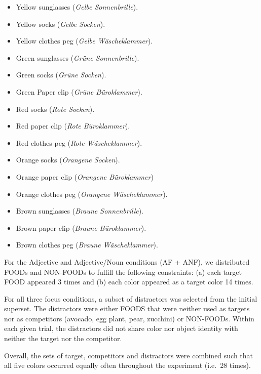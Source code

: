 \documentclass[
]{article}
\providecommand{\tightlist}{%
  \setlength{\itemsep}{0pt}\setlength{\parskip}{0pt}}
\begin{document}
\begin{itemize}
\tightlist
\item
  Yellow sunglasses (\emph{Gelbe Sonnenbrille}).
\item
  Yellow socks (\emph{Gelbe Socken}).
\item
  Yellow clothes peg (\emph{Gelbe Wäscheklammer}).
\item
  Green sunglasses (\emph{Grüne Sonnenbrille}).
\item
  Green socks (\emph{Grüne Socken}).
\item
  Green Paper clip (\emph{Grüne Büroklammer}).
\item
  Red socks (\emph{Rote Socken}).
\item
  Red paper clip (\emph{Rote Büroklammer}).
\item
  Red clothes peg (\emph{Rote Wäscheklammer}).
\item
  Orange socks (\emph{Orangene Socken}).
\item
  Orange paper clip (\emph{Orangene Büroklammer})
\item
  Orange clothes peg (\emph{Orangene Wäscheklammer}).
\item
  Brown sunglasses (\emph{Braune Sonnenbrille}).
\item
  Brown paper clip (\emph{Braune Büroklammer}).
\item
  Brown clothes peg (\emph{Braune Wäscheklammer}).
\end{itemize}

For the Adjective and Adjective/Noun conditions (AF + ANF), we distributed FOODs and NON-FOODs to fulfill the following constraints: (a) each target FOOD appeared 3 times and (b) each color appeared as a target color 14 times.

For all three focus conditions, a subset of distractors was selected from the initial superset.
The distractors were either FOODS that were neither used as targets nor as competitors (avocado, egg plant, pear, zucchini) or NON-FOODs.
Within each given trial, the distractors did not share color nor object identity with neither the target nor the competitor.

Overall, the sets of target, competitors and distractors were combined such that all five colors occurred equally often throughout the experiment (i.e.~28 times).
\end{document}
